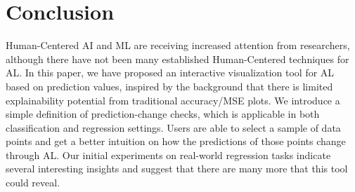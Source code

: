 \documentclass{article}
\begin{document}



 





\section{Conclusion}

Human-Centered AI and ML are receiving increased attention from researchers, although there have not been many established Human-Centered techniques for AL. In this paper, we have proposed an interactive visualization tool for AL based on prediction values, inspired by the background that there is limited explainability potential from traditional accuracy/MSE plots. We introduce a simple definition of prediction-change checks, which is applicable in both classification and regression settings. Users are able to select a sample of data points and get a better intuition on how the predictions of those points change through AL. Our initial experiments on real-world regression tasks indicate several interesting insights and suggest that there are many more that this tool could reveal. 
\end{document}
